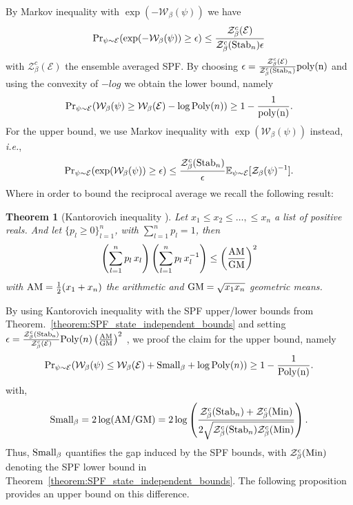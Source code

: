 \documentclass[aps,pra,superscriptaddress,twocolumn,longbibliography]{revtex4-2}
\newtheorem{theorem}{\textbf{Theorem}}
\begin{document}
By Markov inequality with $\exp(-\mathcal{W}_{\beta}(\psi))$ we have
%
\begin{equation}
    {\rm Pr}_{\psi \sim \mathcal{E}}(\exp(-\mathcal{W}_{\beta}(\psi)) \geq \epsilon) \leq \frac{\mathcal{Z}_{\beta}^{c}(\mathcal{E})}{\mathcal{Z}^{c}_{\beta}({\rm Stab}_{n})\epsilon}
\end{equation}
%
with $\mathcal{Z}_{\beta}^{c}(\mathcal{E})$ the ensemble averaged SPF. By choosing $\epsilon = \frac{\mathcal{Z}^{c}_{\beta}(\mathcal{E})}{\mathcal{Z}^{c}_{\beta}({\rm Stab}_{n})}{\rm poly(n)}$ and using the convexity of $-log$ we obtain the lower bound, namely
%
\begin{align}
    {\rm Pr}_{\psi \sim \mathcal{E}}(\mathcal{W}_{\beta}(\psi) \geq \mathcal{W}_{\beta}(\mathcal{E}) - \log {\rm Poly}(n)) \geq 1-\frac{1}{{\rm poly(n)}}.
\end{align}
%
For the upper bound, we use Markov inequality with $\exp(\mathcal{W}_{\beta}(\psi))$ instead, \emph{i.e.},
%
\begin{equation}
    {\rm Pr}_{\psi \sim \mathcal{E}}(\exp(\mathcal{W}_{\beta}(\psi)) \geq \epsilon) \leq \frac{\mathcal{Z}^{c}_{\beta}({\rm Stab}_{n})}{\epsilon} \mathbb{E}_{\psi\sim \mathcal{E}}[\mathcal{Z}_{\beta}(\psi)^{-1}].
\end{equation}
%
Where in order to bound the reciprocal average we recall the following result:
%
\begin{theorem}[Kantorovich inequality \cite{Ptk/Kantorovich/1995}]
Let $x_{1}\leq x_{2} \leq \dots, \leq x_{n}$ a list of positive reals. And let $\{p_{l} \geq 0\}_{l=1}^{n}$, with $\sum_{l=1}^{n}p_{l}=1$, then 
%
\begin{equation}   \left(\sum_{l=1}^{n}p_{l}\,x_{l}\right)\left(\sum_{l=1}^{n}p_{l}\,x^{-1}_{l}\right) \leq \left(\frac{{\rm AM}}{{\rm GM}}\right)^{2}
\end{equation}
%
with ${\rm AM}=\frac{1}{2}(x_{1}+x_{n})$ the arithmetic and ${\rm GM}=\sqrt{x_{1}x_{n}}$ geometric means.
\end{theorem}
%
By using Kantorovich inequality with the SPF upper/lower bounds from Theorem.~\ref{theorem:SPF_state_independent_bounds} and setting $\epsilon=\frac{\mathcal{Z}_{\beta}^{c}(\rm Stab_{n})}{\mathcal{Z}_{\beta}^{c}(\mathcal{E})} {\rm Poly}(n) \left(\frac{{\rm AM}}{{\rm GM}}\right)^{2}$ , we proof the claim for the upper bound, namely
%
\begin{align}
    {\rm Pr}_{\psi \sim \mathcal{E}}(\mathcal{W}_{\beta}(\psi) \leq \mathcal{W}_{\beta}(\mathcal{E})+{\rm Small}_{\beta}+\log {\rm Poly}(n)) \geq 1-\frac{1}{\rm Poly(n)}.
\end{align}
%
with,
%
\begin{equation}
    {\rm Small}_{\beta}=2\log ({\rm AM/GM})= 2\log\left(\frac{\mathcal{Z}^{c}_{\beta}({\rm Stab}_{n})+\mathcal{Z}_{\beta}^{c}({\rm Min})}{2\sqrt{\mathcal{Z}^{c}_{\beta}({\rm Stab}_{n})\mathcal{Z}^{c}_{\beta}({\rm Min})} }\right).
\end{equation}
%
Thus, ${\rm Small}_{\beta}$ quantifies the gap induced by the SPF bounds, with $\mathcal{Z}_{\beta}^{c}({\rm Min})$ denoting the SPF lower bound in
Theorem~\ref{theorem:SPF_state_independent_bounds}. The following proposition provides an upper bound on this difference.
\end{document}
